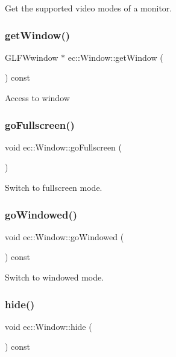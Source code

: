 Get the supported video modes of a monitor. \mbox{\label{classec_1_1_window_abe525ce2f27fecf298b1ad0926024ae3}} 
\subsubsection{\texorpdfstring{get\+Window()}{getWindow()}}
{\footnotesize\ttfamily G\+L\+F\+Wwindow $\ast$ ec\+::\+Window\+::get\+Window (\begin{DoxyParamCaption}{ }\end{DoxyParamCaption}) const}

Access to window \mbox{\label{classec_1_1_window_ab89e0e27d169da6f5d9430b78c77c0ee}} 
\subsubsection{\texorpdfstring{go\+Fullscreen()}{goFullscreen()}}
{\footnotesize\ttfamily void ec\+::\+Window\+::go\+Fullscreen (\begin{DoxyParamCaption}{ }\end{DoxyParamCaption})}

Switch to fullscreen mode. \mbox{\label{classec_1_1_window_aeeaa47b1f8199b4df60f74aa3b2c45f7}} 
\subsubsection{\texorpdfstring{go\+Windowed()}{goWindowed()}}
{\footnotesize\ttfamily void ec\+::\+Window\+::go\+Windowed (\begin{DoxyParamCaption}{ }\end{DoxyParamCaption}) const}

Switch to windowed mode. \mbox{\label{classec_1_1_window_ae03af70ef60b666e60533ede07fad8cf}} 
\subsubsection{\texorpdfstring{hide()}{hide()}}
{\footnotesize\ttfamily void ec\+::\+Window\+::hide (\begin{DoxyParamCaption}{ }\end{DoxyParamCaption}) const}

